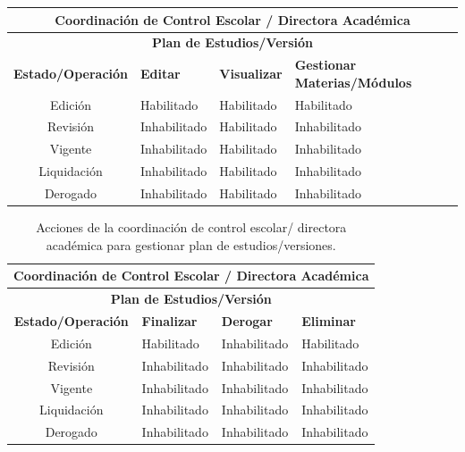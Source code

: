 \begin{table}[htpb!] 
	\centering
	\begin{tabular}{|c|l|l|l|}
		\hline
		\multicolumn{4}{|c|}{\textbf{Coordinación de Control Escolar / Directora Académica}} \\
		\hline
		\multicolumn{4}{|c|}{\textbf{Plan de Estudios/Versión}}
		\\ \hline \hline
		\textbf{Estado/Operación} & \textbf{Editar} & \textbf{Visualizar} & \textbf{Gestionar Materias/Módulos} \\ \hline \hline
		Edición & Habilitado & Habilitado & Habilitado \\ \hline
		Revisión & Inhabilitado & Habilitado & Inhabilitado \\ \hline
		Vigente & Inhabilitado & Habilitado & Inhabilitado \\ \hline
		Liquidación & Inhabilitado & Habilitado & Inhabilitado \\ \hline
		Derogado & Inhabilitado & Habilitado & Inhabilitado \\ \hline
	\end{tabular}
	
\end{table} 
\begin{table}[htpb!]
	
	\centering
	\begin{tabular}{|c|l|l|l|}
		\hline
		\multicolumn{4}{|c|}{\textbf{Coordinación de Control Escolar / Directora Académica}} \\
		\hline
		\multicolumn{4}{|c|}{\textbf{Plan de Estudios/Versión}}
		\\ \hline \hline
		\textbf{Estado/Operación} & \textbf{Finalizar} & \textbf{Derogar} & \textbf{Eliminar} \\ \hline \hline
		Edición & Habilitado & Inhabilitado & Habilitado \\ \hline
		Revisión & Inhabilitado & Inhabilitado & Inhabilitado \\ \hline
		Vigente & Inhabilitado & Inhabilitado & Inhabilitado \\ \hline
		Liquidación & Inhabilitado & Inhabilitado & Inhabilitado \\ \hline
		Derogado & Inhabilitado & Inhabilitado & Inhabilitado \\ \hline
	\end{tabular}
	\caption{Acciones de la coordinación de control escolar/ directora académica para gestionar plan de estudios/versiones.}
	\hypertarget{tb:habilitarAccionesvCCE}{}
	\label{tb:habilitarAccionesvCCE}
\end{table}


